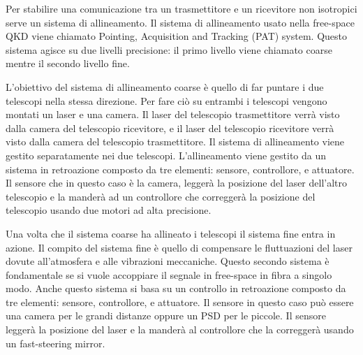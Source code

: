 Per stabilire una comunicazione tra un trasmettitore e un ricevitore non isotropici serve un sistema di allineamento. Il sistema di allineamento usato nella free-space QKD viene chiamato Pointing, Acquisition and Tracking (PAT) system. Questo sistema agisce su due livelli precisione: il primo livello viene chiamato coarse mentre il secondo livello fine.

L'obiettivo del sistema di allineamento coarse è quello di far puntare i due telescopi nella stessa direzione. Per fare ciò su entrambi i telescopi vengono montati un laser e una camera. Il laser del telescopio trasmettitore verrà visto dalla camera del telescopio ricevitore, e il laser del telescopio ricevitore verrà visto dalla camera del telescopio trasmettitore. Il sistema di allineamento viene gestito separatamente nei due telescopi. L'allineamento viene gestito da un sistema in retroazione composto da tre elementi: sensore, controllore, e attuatore. Il sensore che in questo caso è la camera, leggerà la posizione del laser dell'altro telescopio e la manderà ad un controllore che correggerà la posizione del telescopio usando due motori ad alta precisione.

Una volta che il sistema coarse ha allineato i telescopi il sistema fine entra in azione. Il compito del sistema fine è quello di compensare le fluttuazioni del laser dovute all'atmosfera e alle vibrazioni meccaniche. Questo secondo sistema è fondamentale se si vuole accoppiare il segnale in free-space in fibra a singolo modo. Anche questo sistema si basa su un controllo in retroazione composto da tre elementi: sensore, controllore, e attuatore. Il sensore in questo caso può essere una camera per le grandi distanze oppure un PSD per le piccole. Il sensore leggerà la posizione del laser e la manderà al controllore che la correggerà usando un fast-steering mirror.